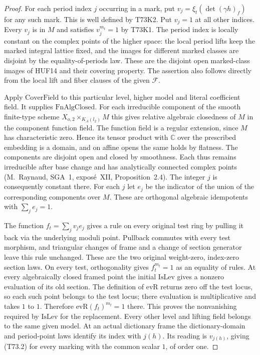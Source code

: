 \begin{proof}
For each period index $j$ occurring in a mark, put
$v_j=\xi_t(\det(\gamma h)_f)$ for any such mark. This is
well defined by T73K2. Put $v_j=1$ at all other indices. Every
$v_j$ is in $M$ and satisfies $v_j^{m_t}=1$ by T73K1.
The period index is locally constant on the complex points of
the higher space: the local period lifts keep the marked integral
lattice fixed, and the images for different marked classes are
disjoint by the equality-of-periods law. These are the disjoint
open marked-class images of HUF14 and their covering property.
The assertion also follows directly from the local lift and fiber
clauses of the given $\mathcal F$.

Apply $\mathrm{CoverField}$ to this particular level, higher model
and literal coefficient field. It supplies $\mathrm{FnAlgClosed}$.
For each irreducible component of the smooth finite-type scheme
$X_{o,2}\times_{K_A(l_2)}M$ this gives relative algebraic closedness
of $M$ in the component function field. The function field is a
regular extension, since $M$ has characteristic zero. Hence its
tensor product with $\mathbb C$ over the prescribed embedding is a
domain, and on affine opens the same holds by flatness. The components
are disjoint open and closed by smoothness. Each thus remains
irreducible after base change and has analytically connected complex
points (M.~Raynaud, SGA~1, expos\'e~XII, Proposition~2.4).
The integer $j$ is consequently constant there. For each $j$ let
$e_j$ be the indicator of the union of the corresponding components
over $M$. These are orthogonal algebraic idempotents with
$\sum_j e_j=1$.

The function $f_t=\sum_j v_j e_j$ gives a rule on every original
test ring by pulling it back via the underlying moduli point. Pullback
commutes with every test morphism, and triangular changes of frame and
a change of section generator leave this rule unchanged. These are the
two original weight-zero, index-zero section laws. On every test,
orthogonality gives $f_t^{m_t}=1$ as an equality of rules. At every
algebraically closed framed point the initial $\mathrm{IsLev}$ gives
a nonzero evaluation of its old section. The definition of
$\mathrm{evR}$ returns zero off the test locus, so each such point
belongs to the test locus; there evaluation is multiplicative and
takes $1$ to $1$. Therefore $\mathrm{evR}(f_t)^{m_t}=1$ there.
This proves the nonvanishing required by $\mathrm{IsLev}$ for the
replacement. Every other level and lifting field belongs to the same
given model. At an actual dictionary frame the dictionary-domain and
period-point laws identify its index with $j(h)$. Its reading is
$v_{j(h)}$, giving (T73.2) for every marking with the common scalar
$1$, of order one.
\end{proof}

